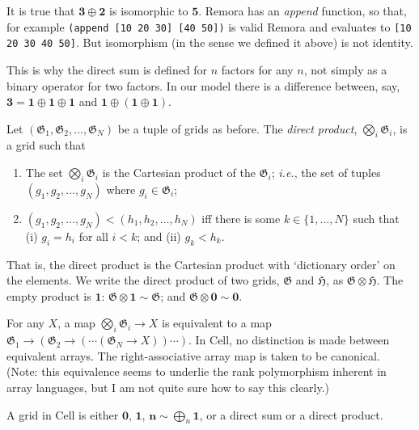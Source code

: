 \documentclass[11pt]{article}
\newcommand{\gr}[1]{\mathfrak{#1}}
\newcommand{\GG}{\gr{G}}
\newcommand{\void}{\mathbf{0}}
\newcommand{\unit}{\mathbf{1}}
\begin{document}
It is true that \(\mathbf{3}\oplus\mathbf{2}\) is isomorphic to \(\mathbf{5}\).
Remora has an \emph{append} function, so that, for example \texttt{(append [10
20 30] [40 50])} is valid Remora and evaluates to \texttt{[10 20 30 40 50]}. But isomorphism (in the sense we defined it above) is not identity.

This is why the direct sum is defined for $n$ factors for any $n$, not simply as
a binary operator for two factors. In our model there is a difference between,
say, $\mathbf{3} = \mathbf{1}\oplus\mathbf{1}\oplus\mathbf{1}$ and
$\mathbf{1}\oplus(\mathbf{1}\oplus\mathbf{1})$.

Let \((\GG_1, \GG_2, \dots, \GG_N)\) be a tuple of grids as before. The
\emph{direct product}, \(\bigotimes_i \GG_i\), is a grid such that
\begin{enumerate}
\item The set \(\bigotimes_i \GG_i\) is the Cartesian product of the \(\GG_i\);
  \emph{i.e.}, the set of tuples \((g_1, g_2, \dotsc, g_N)\) where
  \(g_i\in\GG_i\);
\item \((g_1, g_2, \dotsc, g_N) < (h_1, h_2, \dotsc, h_N)\) iff there is some
  \(k\in\{1, \dotsc, N\}\) such that (i) \(g_i = h_i\) for all \(i<k\); and (ii)
  \(g_k<h_k\).
\end{enumerate}
That is, the direct product is the Cartesian product with `dictionary order' on
the elements. We write the direct product of two grids, \(\gr{G}\) and
\(\gr{H}\), as \(\gr{G}\otimes\gr{H}\). The empty product is \(\unit\): \(\GG\otimes\unit\sim
\GG\); and \(\GG\otimes\void \sim \void\).

For any \(X\), a map \(\bigotimes_i\GG_i \to X\) is equivalent to a map \(\GG_1 \to
(\GG_2 \to (\dotsm (\GG_N \to X))\dotsm )\). In Cell, no distinction is made between
equivalent arrays. The right-associative array map is taken to be
canonical. (Note: this equivalence seems to underlie the rank polymorphism
inherent in array languages, but I am not quite sure how to say this clearly.)

A grid in Cell is either \(\void\), \(\unit\), $\mathbf{n}\sim \bigoplus_n \unit$,
or a direct sum or a direct product.


\end{document}

